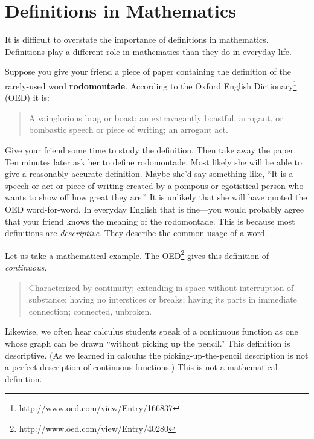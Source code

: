 \chapter{Definitions in Mathematics}
\label{appendix:definitions}
\thispagestyle{empty}

It is difficult to overstate the importance of definitions in mathematics. Definitions play a different role in mathematics than they do in everyday life. 

Suppose you give your friend a piece of paper containing the definition of the rarely-used word \textbf{rodomontade}. According to the Oxford English Dictionary\footnote{http://www.oed.com/view/Entry/166837} (OED) it is:
\begin{quote}
A vainglorious brag or boast; an extravagantly boastful, arrogant, or bombastic speech or piece of writing; an arrogant act.
\end{quote}
Give your friend some time to study the definition. Then take away the paper. Ten minutes later ask her to define rodomontade. Most likely she will be able to give a reasonably accurate definition. Maybe she'd say something like, ``It is a speech or act or piece of writing created by a pompous or egotistical person who wants to show off how great they are.'' It is unlikely that she will have quoted the OED word-for-word. In everyday English that is fine---you would probably agree that your friend knows the meaning of the rodomontade. This is because most definitions are \emph{descriptive}. They describe the common usage of a word. 

Let us take a mathematical example. The OED\footnote{http://www.oed.com/view/Entry/40280}  gives this definition of \emph{continuous}.
\begin{quote}
Characterized by continuity; extending in space without interruption of substance; having no interstices or breaks; having its parts in immediate connection; connected, unbroken.
\end{quote}
Likewise, we often hear calculus students speak of a continuous function as one whose graph can be drawn ``without picking up the pencil.'' This definition is descriptive. (As we learned in calculus the picking-up-the-pencil description is not a perfect description of continuous functions.) This is not a mathematical definition. 

